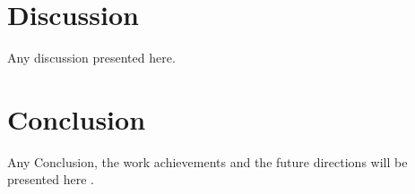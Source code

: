 \documentclass[10pt,conference]{ieeeconf}
\begin{document}
\section{Discussion}
Any discussion presented here.

\section{Conclusion}
Any Conclusion, the work achievements and the future directions will be presented here \cite{wickramasuriya2019skin}.



\end{document}
